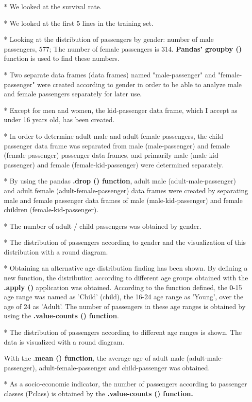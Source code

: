 \documentclass[onecolumn]{article}
\begin{document}
* We looked at the survival rate.

* We looked at the first 5 lines in the training set.

* Looking at the distribution of passengers by gender: number of male passengers, 577; The number of female passengers is 314.\textbf{ Pandas' groupby ()} function is used to find these numbers.

* Two separate data frames (data frames) named "male-passenger" and "female-passenger" were created according to gender in order to be able to analyze male and female passengers separately for later use.

* Except for men and women, the kid-passenger data frame, which I accept as under 16 years old, has been created.

* In order to determine adult male and adult female passengers, the child-passenger data frame was separated from male (male-passenger) and female (female-passenger) passenger data frames, and primarily male (male-kid-passenger) and female (female-kid-passenger) were determined separately.

* By using the pandas \textbf{.drop () function}, adult male (adult-male-passenger) and adult female (adult-female-passenger) data frames were created by separating male and female passenger data frames of male (male-kid-passenger) and female children (female-kid-passenger).

* The number of adult / child passengers was obtained by gender.

* The distribution of passengers according to gender and the visualization of this distribution with a round diagram.

* Obtaining an alternative age distribution finding has been shown. By defining a new function, the distribution according to different age groups obtained with the \textbf{.apply () }application was obtained. According to the function defined, the 0-15 age range was named as 'Child' (child), the 16-24 age range as 'Young', over the age of 24 as 'Adult'. The number of passengers in these age ranges is obtained by using the \textbf{.value-counts () function}.


* The distribution of passengers according to different age ranges is shown. The data is visualized with a round diagram.

With the .\textbf{mean () function}, the average age of adult male (adult-male-passenger), adult-female-passenger and child-passenger was obtained.

* As a socio-economic indicator, the number of passengers according to passenger classes (Pclass) is obtained by the \textbf{.value-counts () function.}
\end{document}
